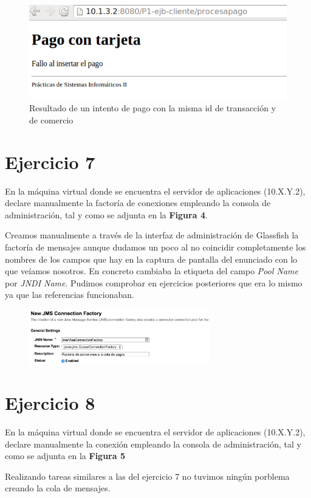 \documentclass[a4paper, 10pt]{article}
\begin{document}
 	\begin{figure}[htbp]
		\centering	
		\includegraphics[width=1\textwidth]{pantallazos/ejercicio6b.png}
		\caption{Resultado de un intento de pago con la misma id de transacción y de comercio}
	\end{figure}



\section{Ejercicio 7}
\begin{mdframed}
 En la máquina virtual donde se encuentra el servidor de aplicaciones (10.X.Y.2), declare
manualmente la factoría de conexiones empleando la consola de administración, tal y como se adjunta en
la \textbf{Figura 4}. 
\end{mdframed}
	Creamos manualmente a través de la interfaz de administración de Glassfish la factoría de mensajes aunque dudamos un poco al no coincidir completamente los nombres de los campos que hay en la captura de pantalla del enunciado con lo que veíamos nosotros. En concreto cambiaba la etiqueta del campo \textit{Pool Name} por \textit{JNDI Name}. Pudimos comprobar en ejercicios posteriores que era lo mismo ya que las referencias funcionaban.

	\begin{figure}[htbp]
		\centering
		\includegraphics[width=0.7\textwidth]{pantallazos/ejercicio7.png}
	\end{figure}




\section{Ejercicio 8}
\begin{mdframed}
En la máquina virtual donde se encuentra el servidor de aplicaciones (10.X.Y.2), declare
manualmente la conexión empleando la consola de administración, tal y como se adjunta en la \textbf{Figura 5}
\end{mdframed}
	Realizando tareas similares a las del ejercicio 7 no tuvimos ningún porblema creando la cola de mensajes.
\end{document}

